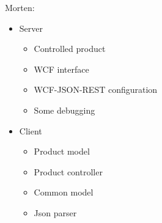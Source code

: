 \newpage Morten: 
\begin{itemize}
	\item Server
	\begin{itemize}
		\item Controlled product
		\item WCF interface
		\item WCF-JSON-REST configuration
		\item Some debugging
	\end{itemize}
	\item Client
	\begin{itemize}
		\item Product model
		\item Product controller
		\item Common model
		\item Json parser
	\end{itemize}
\end{itemize}